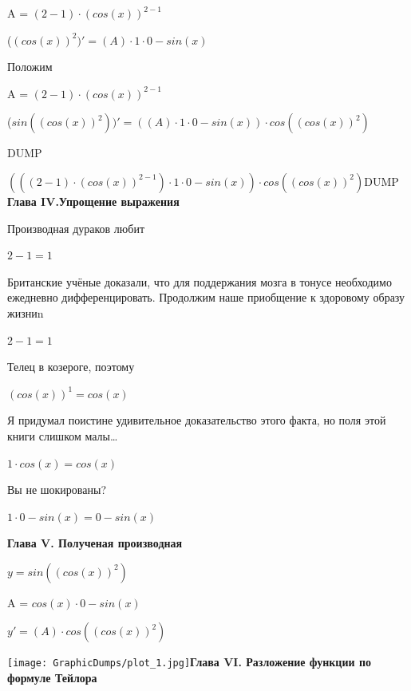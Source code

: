 \documentclass[12pt,a4paper,fleqn]{article}
\begin{document}
\begin{center}
A = $(2-1) \cdot (cos(x))^{2-1}$\end{center}
\begin{center}
 ($(cos(x))^{2})'
  = (A) \cdot 1 \cdot 0-sin(x)$\end{center}
Положим

\begin{center}
A = $(2-1) \cdot (cos(x))^{2-1}$\end{center}
\begin{center}
 ($sin((cos(x))^{2}))'
  = ((A) \cdot 1 \cdot 0-sin(x)) \cdot cos((cos(x))^{2})$\end{center}
DUMP

$(((2-1) \cdot (cos(x))^{2-1}) \cdot 1 \cdot 0-sin(x)) \cdot cos((cos(x))^{2})$DUMP
\newpage \textbf{\LARGE{Глава IV.Упрощение выражения}}

Производная дураков любит\cite{link2}

\begin{center}$2-1 = 1$\end{center}
Британские учёные доказали, что для поддержания мозга в тонусе необходимо ежедневно дифференцировать. Продолжим наше приобщение к здоровому образу жизниn

\begin{center}$2-1 = 1$\end{center}
Телец в козероге, поэтому

\begin{center}
$(cos(x))^{1} = cos(x)$\end{center}
Я придумал поистине удивительное доказательство этого факта, но поля этой книги слишком малы\ldots

\begin{center}
$1 \cdot cos(x) = cos(x)$\end{center}
Вы не шокированы?\cite{link3}

\begin{center}
$1 \cdot 0-sin(x) = 0-sin(x)$\end{center}
\newpage \textbf{\LARGE{Глава V. Полученая производная}}

$y = $$sin((cos(x))^{2})$

\begin{center}
A = $cos(x) \cdot 0-sin(x)$\end{center}
$y' = $$(A) \cdot cos((cos(x))^{2})$

\texttt{[image: GraphicDumps/plot\_1.jpg]}\newpage \textbf{\LARGE{Глава VI. Разложение функции по формуле Тейлора}}
\end{document}
